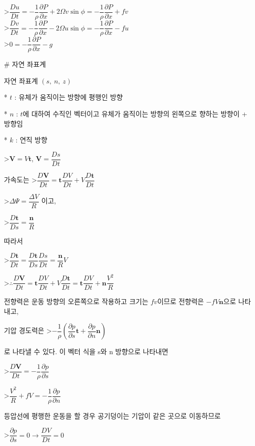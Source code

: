 >$ \dfrac{Du}{Dt}
= - \dfrac{1}{\rho} \dfrac{\partial P}{\partial x} 
+ 2 \Omega v \sin \phi 
= - \dfrac{1}{\rho} \dfrac{\partial P}{\partial x} 
+ f v $\\

>$ \dfrac{Dv}{Dt}
= - \dfrac{1}{\rho} \dfrac{\partial P}{\partial x} 
- 2 \Omega u \sin \phi
= - \dfrac{1}{\rho} \dfrac{\partial P}{\partial x}
- f u $\\

>$ 0
= - \dfrac{1}{\rho} \dfrac{\partial P}{\partial x} 
- g $



# 자연 좌표계

자연 좌표계 $ (s,~n,~z)$ 

* $ t $ : 유체가 움직이는 방향에 평행인 방향

* $ n $ : $ t $에 대하여 수직인 벡터이고 유체가 움직이는 방향의 왼쪽으로 향하는 방향이 + 방향임

* $ k $ : 연직 방향

>$\mathbf{V} = V \mathbf{t}$, $\mathbf{V} = \dfrac{Ds}{Dt}$

가속도는
>$ \dfrac{D\mathbf{V}}{Dt} = \mathbf{t} \dfrac{DV}{Dt} + V \dfrac{D \mathbf{t}}{Dt}$

>$ \Delta \Psi = \dfrac{\Delta V}{R}$ 이고, 

>$ \dfrac{D \mathbf{t}}{Ds} = \dfrac{\mathbf{n}}{R}$

따라서

>$ \dfrac{D \mathbf{t}}{Dt} = \dfrac{D \mathbf{t}}{Ds} \dfrac{Ds}{Dt} = \dfrac{\mathbf{n}}{R} V$

>$ \therefore \dfrac{D \mathbf{V}}{Dt} = \mathbf{t} \dfrac{DV}{Dt} + V \dfrac{D\mathbf{t}}{Dt} = \mathbf{t} \dfrac{DV}{Dt} + \mathbf{n} \dfrac{V^{2}}{R} $

전향력은 운동 방향의 오른쪽으로 작용하고 크기는 $fv$이므로 전향력은 $-f V \mathbf{n}$으로 나타내고, 

기압 경도력은 
>$ - \dfrac{1}{\rho} \left( \dfrac{\partial p}{\partial s} \mathbf{t} + \dfrac{\partial p}{\partial n} \mathbf{n} \right)$

로 나타낼 수 있다. 이 벡터 식을 s와 n 방향으로 나타내면

>$ \dfrac{D\mathbf{V}}{Dt} = - \dfrac{1}{\rho} \dfrac{\partial p}{\partial s}$

>$  \dfrac{V^{2}}{R} + fV = - \dfrac{1}{\rho} \dfrac{\partial p}{\partial n}$

등압선에 평행한 운동을 할 경우 공기덩이는 기압이 같은 곳으로 이동하므로

>$ \dfrac{\partial p}{\partial s} = 0 \rightarrow  \dfrac{DV}{Dt} = 0$





